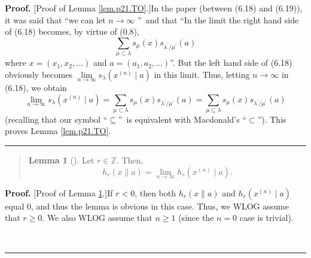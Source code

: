 \documentclass[numbers=enddot,12pt,final,onecolumn,notitlepage]{scrartcl}%
\newenvironment{statement}{\begin{quote}}{\end{quote}}
\theoremstyle{definition}
\newtheorem{lem}[theo]{Lemma}
\newenvironment{lemmain}[1][]
{\begin{statement}\begin{lem}[#1]}
{\end{lem}\end{statement}}
\newenvironment{proof}[1][Proof]{\noindent\textbf{#1.} }{\ \rule{0.5em}{0.5em}}
\newenvironment{lemmain}[1][Proof]{\noindent\textbf{#1.} }{\ \rule{0.5em}{0.5em}}
\let\sumnonlimits\sum
\renewcommand{\sum}{\sumnonlimits\limits}
\begin{document}
\begin{enumerate}
\begin{proof}
[Proof of Lemma \ref{lem.p21.TO}.]In the paper (between (6.18) and (6.19)), it
was said that \textquotedblleft we can let $n\rightarrow\infty$%
\textquotedblright\ and that \textquotedblleft In the limit the right hand
side of (6.18) becomes, by virtue of (0.8),
\[
\sum_{\mu\subset\lambda}s_{\mu}\left(  x\right)  s_{\lambda^{\prime}%
/\mu^{\prime}}\left(  a\right)
\]
where $x=\left(  x_{1},x_{2},\ldots\right)  $ and $a=\left(  a_{1}%
,a_{2},\ldots\right)  $\textquotedblright. But the left hand side of (6.18)
obviously becomes $\lim\limits_{n\rightarrow\infty}s_{\lambda}\left(
x^{\left(  n\right)  }\mid a\right)  $ in this limit. Thus, letting
$n\rightarrow\infty$ in (6.18), we obtain%
\[
\lim\limits_{n\rightarrow\infty}s_{\lambda}\left(  x^{\left(  n\right)  }\mid
a\right)  =\sum_{\mu\subset\lambda}s_{\mu}\left(  x\right)  s_{\lambda
^{\prime}/\mu^{\prime}}\left(  a\right)  =\sum_{\mu\subseteq\lambda}s_{\mu
}\left(  x\right)  s_{\lambda^{\prime}/\mu^{\prime}}\left(  a\right)
\]
(recalling that our symbol \textquotedblleft$\subseteq$\textquotedblright\ is
equivalent with Macdonald's \textquotedblleft$\subset$\textquotedblright).
This proves Lemma \ref{lem.p21.TO}.
\end{proof}

\begin{lemmain}
\label{lem.p21.TA}Let $r\in\mathbb{Z}$. Then,%
\[
h_{r}\left(  x\parallel a\right)  =\lim\limits_{n\rightarrow\infty}%
h_{r}\left(  x^{\left(  n\right)  }\mid a\right)  .
\]

\end{lemmain}

\begin{proof}
[Proof of Lemma \ref{lem.p21.TA}.]If $r<0$, then both $h_{r}\left(  x\parallel
a\right)  $ and $h_{r}\left(  x^{\left(  n\right)  }\mid a\right)  $ equal
$0$, and thus the lemma is obvious in this case. Thus, we WLOG assume that
$r\geq0$. We also WLOG assume that $n\geq1$ (since the $n=0$ case is trivial).


\end{proof}
\end{enumerate}
\end{document}

